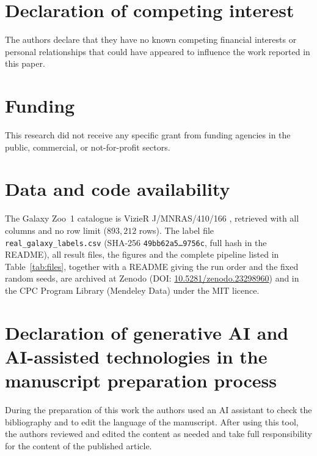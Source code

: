 \documentclass[preprint,12pt]{elsarticle}
\begin{document}
\section*{Declaration of competing interest}
The authors declare that they have no known competing financial interests or personal relationships that could have appeared to influence the work reported in this paper.

\section*{Funding}
This research did not receive any specific grant from funding agencies in the public, commercial, or not-for-profit sectors.

\section*{Data and code availability}
The Galaxy Zoo~1 catalogue is VizieR J/MNRAS/410/166 \cite{Lintott2011}, retrieved with all columns and no row limit ($893{,}212$ rows).
The label file \texttt{real\_galaxy\_labels.csv} (SHA-256 \texttt{49bb62a5\ldots9756c}, full hash in the README), all result files, the figures and the complete pipeline listed in Table~\ref{tab:files}, together with a README giving the run order and the fixed random seeds, are archived at Zenodo (DOI: \href{https://doi.org/10.5281/zenodo.23298960}{10.5281/zenodo.23298960}) and in the CPC Program Library (Mendeley Data) under the MIT licence.

\section*{Declaration of generative AI and AI-assisted technologies in the manuscript preparation process}
During the preparation of this work the authors used an AI assistant to check the bibliography and to edit the language of the manuscript. After using this tool, the authors reviewed and edited the content as needed and take full responsibility for the content of the published article.



\end{document}
